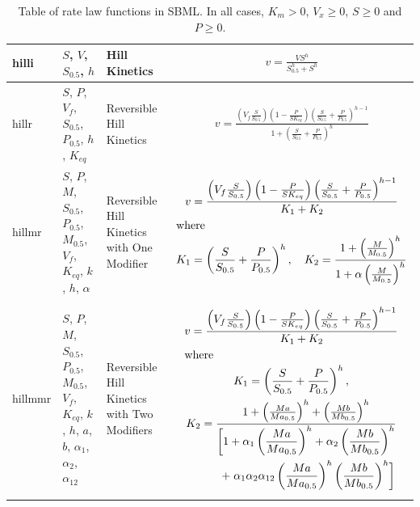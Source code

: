 \documentclass[10pt]{cekarticle}
\newcommand{\changed}[1]{\textcolor{BrickRed}{#1}}
\begin{document}
\begin{table}[ht]
\begin{tabular}{|m{0.5in}|>{\raggedright}m{0.77in}|>{\raggedright}m{1.5in}|m{3.03in}|}
hilli & $S$, $V$, $S_{0.5}$, $h$ & Hill Kinetics &
\begin{gather*}
v = \frac{V S^h}{S_{0.5}^h + S^h}
\end{gather*}
\\ \hline

hillr & $S$, $P$, $V_f$, $S_{0.5}$, $P_{0.5}$, $h$, $K_{eq}$ & Reversible
Hill Kinetics &
\begin{gather*}
v = \frac{\left(V_f \frac{S}{S_{0.5}}
\right) \left(1 - \frac{P}{S K_{eq}} \right)
\left(\frac{S}{S_{0.5}} + \frac{P}{P_{0.5}}\right)^{h-1}}{1 +
\left(\frac{S}{S_{0.5}} + \frac{P}{P_{0.5}}\right)^h}
\end{gather*}
\\ \hline

hillmr & $S$, \changed{$P$, $M$, $S_{0.5}$, $P_{0.5}$, $M_{0.5}$}, $V_f$, $K_{eq}$, $k$, $h$, $\alpha$ & Reversible Hill
Kinetics with One Modifier &
\begin{gather*}
v = \frac{\left(V_f
\frac{S}{S_{0.5}} \right) \left(1 - \frac{P}{S K_{eq}} \right)
\left(\frac{S}{S_{0.5}} + \frac{P}{P_{0.5}}\right)^{h-1}} {K_1 +
K_2} \\
\intertext{where}
K_1 = \left(\frac{S}{S_{0.5}} +
\frac{P}{P_{0.5}}\right)^h, \quad K_2 = \frac{1 + \left(\frac{M}{M_{0.5}}\right)^h}{1
  + \alpha \left(\frac{M}{M_{0.5}}\right)^h}
\end{gather*}
\\ \hline

hillmmr & $S$, $P$, $M$, \changed{$S_{0.5}$, $P_{0.5}$, $M_{0.5}$}, $V_f$, $K_{eq}$, $k$, $h$, $a$, $b$, $\alpha_1$, $\alpha_2$, $\alpha_{12}$ &
Reversible Hill Kinetics with Two Modifiers &
\begin{gather*}
v = \frac{\left(V_f
\frac{S}{S_{0.5}} \right) \left(1 - \frac{P}{S K_{eq}} \right)
\left(\frac{S}{S_{0.5}} + \frac{P}{P_{0.5}}\right)^{h-1}} {K_1 +
K_2} \\
\intertext{where}
K_1 = \left(\frac{S}{S_{0.5}} + \frac{P}{P_{0.5}}\right)^h ,\\
K_2 = \frac{1 + \left(\frac{Ma}{Ma_{0.5}}\right)^h + \left( \frac{Mb}{Mb_{0.5}}
\right)^h }{\begin{split}
\biggl[ 1 + \alpha_1 \left(\frac{Ma}{Ma_{0.5}}\right)^h +
\alpha_2 \left(\frac{Mb}{Mb_{0.5}}\right)^h \\
+\; \alpha_1 \alpha_2
\alpha_{12} \left( \frac{Ma}{Ma_{0.5}} \right)^h \left(
  \frac{Mb}{Mb_{0.5}} \right)^h \biggr] \end{split} }
\end{gather*}
\\ \hline

\end{tabular}
\caption{Table of rate law functions in SBML.  In all cases, $K_m > 0$, $V_x \geq 0$, $S
  \geq 0$ and $P \geq 0$.}
\label{tab:ratelaws}
\end{table}
\end{document}
